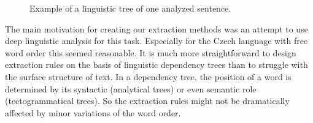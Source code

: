\documentclass[12pt,a4paper,twoside,notitlepage]{article}
\begin{document}
\begin{figure}[p]
\centerline{}
\caption{Example of a linguistic tree of one analyzed sentence.}
\label{fig:intro_damage_tree} 
\end{figure}



The main motivation for creating our extraction methods was an attempt to use deep linguistic analysis for this task. Especially for the Czech language with free word order this seemed reasonable. It is much more straightforward to design extraction rules on the basis of linguistic dependency trees than to struggle with the surface structure of text. In a dependency tree, the position of a word is determined by its syntactic (analytical trees) or even semantic role (tectogrammatical trees). So the extraction rules might not be dramatically affected by minor variations of the word order.
\end{document}
